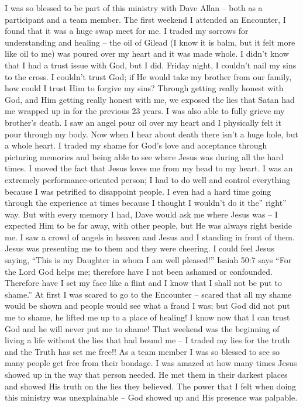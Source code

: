 \documentclass[oneside]{book}
\begin{document}
I was so blessed to be part of this ministry with Dave Allan – both as a participant and a team member.
The first weekend I attended an Encounter, I found that it was a huge swap meet for me. I traded my sorrows for understanding and healing – the oil of Gilead (I know it is balm, but it felt more like oil to me) was poured over my heart and it was made whole. I didn’t know that I had a trust issue with God, but I did. Friday night, I couldn’t nail my sins to the cross. I couldn’t trust God; if He would take my brother from our family, how could I trust Him to forgive my sins? Through getting really honest with God, and Him getting really honest with me, we exposed the lies that Satan had me wrapped up in for the previous 23 years. I was also able to fully grieve my brother’s death. I saw an angel pour oil over my heart and I physically felt it pour through my body. Now when I hear about death there isn’t a huge hole, but a whole heart.
I traded my shame for God’s love and acceptance through picturing memories and being able to see where Jesus was during all the hard times. I moved the fact that Jesus loves me from my head to my heart.
I was an extremely performance-oriented person; I had to do well and control everything because I was petrified to disappoint people. I even had a hard time going through the experience at times because I thought I wouldn’t do it the” right” way. But with every memory I had, Dave would ask me where Jesus was – I expected Him to be far away, with other people, but He was always right beside me. I saw a crowd of angels in heaven and Jesus and I standing in front of them. Jesus was presenting me to them and they were cheering. I could feel Jesus saying, “This is my Daughter in whom I am well pleased!”
Isaiah 50:7 says “For the Lord God helps me; therefore have I not been ashamed or confounded. Therefore have I set my face like a flint and I know that I shall not be put to shame.” At first I was scared to go to the Encounter – scared that all my shame would be shown and people would see what a fraud I was; but God did not put me to shame, he lifted me up to a place of healing! I know now that I can trust God and he will never put me to shame!
That weekend was the beginning of living a life without the lies that had bound me – I traded my lies for the truth and the Truth has set me free!!
As a team member I was so blessed to see so many people get free from their bondage. I was amazed at how many times Jesus showed up in the way that person needed. He met them in their darkest places and showed His truth on the lies they believed. The power that I felt when doing this ministry was unexplainable – God showed up and His presence was palpable.
\end{document}
